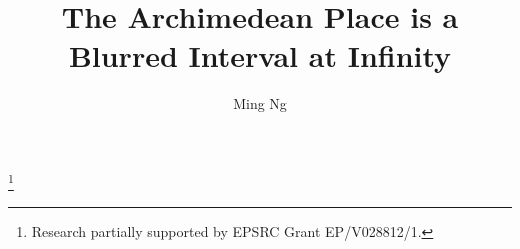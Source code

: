 \documentclass[a4paper, 11pt,reqno]{amsart}
\begin{document}

\newtheorem{theorem}{Theorem}[section]
\newtheorem*{theorem*}{Theorem}
\newtheorem*{condition*}{Condition}
\newtheorem*{definition*}{Definition}
\newtheorem*{corollary*}{Corollary}
\newtheorem{proposition}[theorem]{Proposition}
\newtheorem{lemma}[theorem]{Lemma}
\newtheorem{corollary}[theorem]{Corollary}
\newtheorem{claim}[theorem]{Claim}
\newtheorem{conclusion}[theorem]{Conclusion}
\newtheorem{hypothesis}[theorem]{Hypothesis}
\newtheorem{conjecture}[theorem]{Conjecture}
\newtheorem{setup}[theorem]{Setup}
\newtheorem{summarytheorem}{Summary Theorem}[section]

\newtheorem{maintheorem}{Theorem}
\renewcommand*{\themaintheorem}{\Alph{maintheorem}}
\newtheorem*{theorem:SINGLEPRIME}{Theorem~\ref{thm:DESCENTsinglePRIME}}
\newtheorem*{theorem:ARCHPRIME}{Theorem~\ref{thm:ARCHIMEDEANPLACE}}
\newtheorem*{theorem:OstrowskiQ}{Theorem~\ref{thm:ostrowskiQ}}



\theoremstyle{definition}
\newtheorem{definition}[theorem]{Definition}
\newtheorem{question}[theorem]{Question}
\newtheorem{action}[theorem]{Action Item}
\newtheorem{answer}[theorem]{Answer}
\newtheorem*{problem*}{Problem}
\newtheorem{goal}[theorem]{Goal}
\newtheorem{remark}[theorem]{Remark}
\newtheorem{observation}[theorem]{Observation}
\newtheorem{discussion}[theorem]{Discussion}
\newtheorem{guess}[theorem]{Guess}
\newtheorem{example}[theorem]{Example}
\newtheorem{condition}[theorem]{Condition}
\newtheorem{warning}[theorem]{Warning}
\newtheorem{notation}[theorem]{Notation}
\newtheorem{construction}[theorem]{Construction}

\newtheorem{problem}[theorem]{Problem}
\newtheorem{fact}[theorem]{Fact}
\newtheorem{thesis}[theorem]{Thesis}
\newtheorem{convention}[theorem]{Convention}
\newtheorem{summary}[theorem]{Summary}





\title{The Archimedean Place is a Blurred Interval at Infinity} 
\author{Ming Ng}
\thanks{\noindent Research partially supported by EPSRC Grant EP/V028812/1.}

\end{document}

